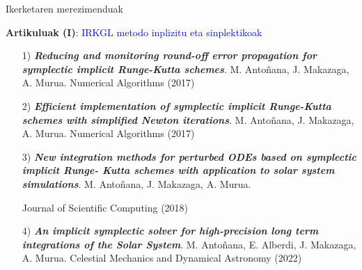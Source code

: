 \documentclass[
 10pt,%
 compress,%
 t,       %
 xcolor=svgnames
]{beamer}
\theoremstyle{definition} \newtheorem{definicion}{Definicion}[section]
\theoremstyle{propiedades} \newtheorem{propiedades}{Propiedades}[section]
\begin{document}
\begin{frame}{Ikerketaren merezimenduak} 

\medskip
\textbf{Artikuluak (I)}: \textcolor{blue}{IRKGL metodo inplizitu eta sinplektikoak}

\medskip
\medskip
\begin{itemize}
\small
\item[1)] \textbf{\textit{Reducing and monitoring round-off error propagation for symplectic implicit Runge-Kutta schemes}}. M. Antoñana, J. Makazaga, A. Murua. Numerical Algorithms (2017)

\medskip
\item[2)] \textbf{\textit{Efficient implementation of symplectic implicit Runge-Kutta schemes with simplified Newton iterations}}. M. Antoñana, J. Makazaga, A. Murua. Numerical Algorithms (2017)

\medskip
\item[3)] \textbf{\textit{New integration methods for perturbed ODEs based on symplectic implicit Runge- Kutta schemes with application to solar system simulations}}. M. Antoñana, J. Makazaga, A. Murua.

Journal of Scientific Computing (2018)

\medskip

\item[4)] \textbf{\textit{An implicit symplectic solver for high-precision long term  integrations of the Solar System}}. M. Antoñana, E. Alberdi, J. Makazaga, A. Murua.  Celestial Mechanics and Dynamical Astronomy (2022) 


\end{itemize}
%

\end{frame}
\end{document}
